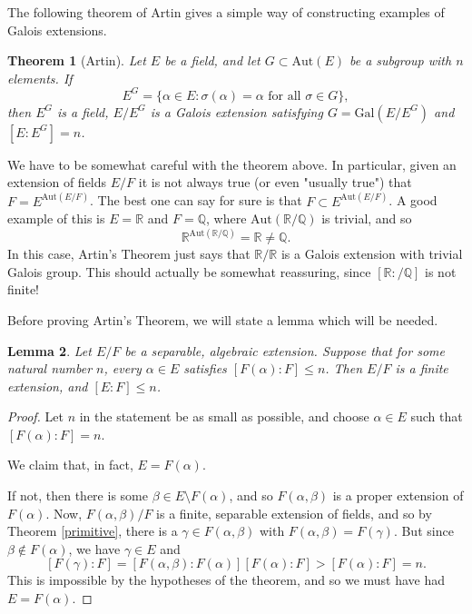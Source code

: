\documentclass[12pt]{report}
\newtheorem{thm}{Theorem}[section]
\newtheorem{lemma}[thm]{Lemma}
\theoremstyle{definition}
\def\QQ{\mathbb{Q}}
\def\RR{\mathbb{R}}
\def\Aut{\text{Aut}}
\def\aa{\alpha}
\def\bb{\beta}
\def\Gal{\text{Gal}}
\begin{document}
The following theorem of Artin gives a simple way of constructing examples
of Galois extensions.

\begin{thm}[Artin]\label{artin}
    Let $E$ be a field, and let $G \subset \Aut(E)$ be a subgroup with $n$ elements. If $$E^G = \{ \aa\in E : \sigma(\aa) = \aa \mbox{ for all } \sigma \in G\},$$ then $E^G$ is a field, $E/E^G$ is a Galois extension satisfying $G = \Gal(E/E^G)$ and $[E : E^G] = n$.
\end{thm}

We have to be somewhat careful with the theorem above. In particular, given an extension of fields $E/F$ it is not always true (or even "usually true") that $F = E^{\Aut(E/F)}$. The best one can say for sure is that $F \subset E^{\Aut(E/F)}$. A good example of this is $E = \RR$ and $F = \QQ$, where $\Aut(\RR/\QQ)$ is trivial, and so $$\RR^{\Aut(\RR/\QQ)} = \RR \not= \QQ.$$
In this case, Artin's Theorem just says that $\RR/\RR$ is a Galois extension with trivial Galois group. This should actually be somewhat reassuring, since $[\RR : /\QQ]$ is not finite! 

Before proving Artin's Theorem, we will state a lemma which will be
needed.

\begin{lemma}
    Let $E/F$ be a separable, algebraic extension. Suppose that for some natural number $n$, every $\aa \in E$ satisfies $[F(\aa) : F] \leq n$. Then $E/F$ is a finite extension, and $[E : F] \leq n$.
\end{lemma}

\begin{proof}
    Let $n$ in the statement be as small as possible, and choose $\aa \in E$ such that $[F(\aa) : F] = n$. 
    
    We claim that, in fact, $E = F(\aa)$.

    If not, then there is some $\bb \in E\setminus F(\aa)$, and so $F(\aa,\bb)$ is a proper extension of $F(\aa)$. Now, $F(\aa,\bb)/F$ is a finite, separable extension of fields, and so by Theorem \ref{primitive}, there is a $\gamma \in F(\aa,\bb)$ with $F(\aa,\bb) = F(\gamma)$. But since $\bb \notin F(\aa)$, we have $\gamma\in E$ and
    $$[F(\gamma) : F] = [F(\aa,\bb) : F(\aa)][F(\aa) : F] > [F(\aa) : F] = n.$$
    This is impossible by the hypotheses of the theorem, and so we must have had $E = F(\aa)$.
\end{proof}
\end{document}
